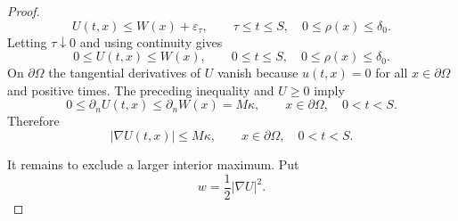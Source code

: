 \documentclass[11pt]{article}
\theoremstyle{remark}
\begin{document}
\begin{proof}
\[
        U(t,x)\le W(x)+\varepsilon_\tau,
        \qquad \tau\le t\le S,
        \quad 0\le\rho(x)\le\delta_0.
\]
Letting $\tau\downarrow0$ and using continuity gives
\[
        0\le U(t,x)\le W(x),
        \qquad 0\le t\le S,
        \quad 0\le\rho(x)\le\delta_0.
\]
On $\partial\Omega$ the tangential derivatives of $U$ vanish because $u(t,x)=0$ for all $x\in\partial\Omega$ and positive times.  The preceding inequality and $U\ge0$ imply
\[
        0\le \partial_n U(t,x)\le \partial_n W(x)=M\kappa,
        \qquad x\in\partial\Omega,
        \quad 0<t<S.
\]
Therefore
\begin{equation}\label{eq:boundary-gradient-bound}
        |\nabla U(t,x)|\le M\kappa,
        \qquad x\in\partial\Omega,
        \quad 0<t<S.
\end{equation}

It remains to exclude a larger interior maximum.  Put
\[
        w=\frac12|\nabla U|^2.
\]


\end{proof}
\end{document}
